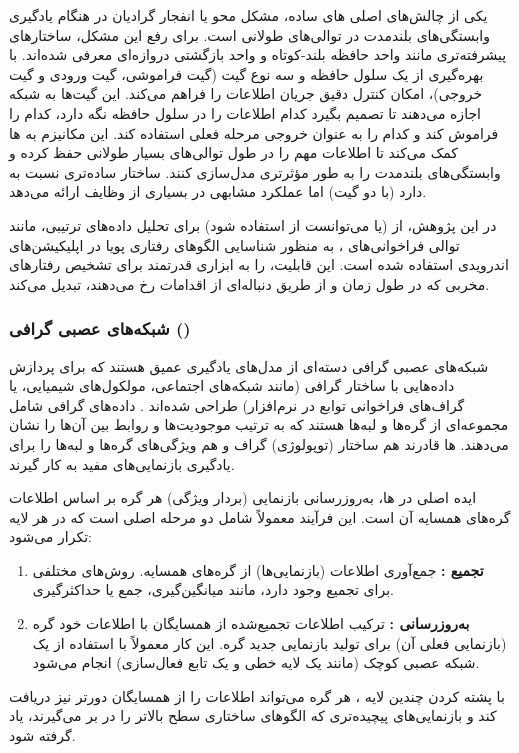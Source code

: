 یکی از چالش‌های اصلی های ساده، مشکل محو یا انفجار گرادیان  در هنگام یادگیری وابستگی‌های بلندمدت در توالی‌های طولانی است. برای رفع این مشکل، ساختارهای پیشرفته‌تری مانند واحد حافظه بلند-کوتاه  \cite{Hochreiter1997} و واحد بازگشتی دروازه‌ای  \cite{Cho2014} معرفی شده‌اند.  با بهره‌گیری از یک سلول حافظه  و سه نوع گیت (گیت فراموشی، گیت ورودی و گیت خروجی)، امکان کنترل دقیق جریان اطلاعات را فراهم می‌کند. این گیت‌ها به شبکه اجازه می‌دهند تا تصمیم بگیرد کدام اطلاعات را در سلول حافظه نگه دارد، کدام را فراموش کند و کدام را به عنوان خروجی مرحله فعلی استفاده کند. این مکانیزم به ها کمک می‌کند تا اطلاعات مهم را در طول توالی‌های بسیار طولانی حفظ کرده و وابستگی‌های بلندمدت را به طور مؤثرتری مدل‌سازی کنند.  ساختار ساده‌تری نسبت به  دارد (با دو گیت) اما عملکرد مشابهی در بسیاری از وظایف ارائه می‌دهد.

در این پژوهش، از  (یا می‌توانست از  استفاده شود) برای تحلیل داده‌های ترتیبی، مانند توالی فراخوانی‌های ، به منظور شناسایی الگوهای رفتاری پویا در اپلیکیشن‌های اندرویدی استفاده شده است. این قابلیت،  را به ابزاری قدرتمند برای تشخیص رفتارهای مخربی که در طول زمان و از طریق دنباله‌ای از اقدامات رخ می‌دهند، تبدیل می‌کند.

\subsubsection{شبکه‌های عصبی گرافی ()}
شبکه‌های عصبی گرافی  دسته‌ای از مدل‌های یادگیری عمیق هستند که برای پردازش داده‌هایی با ساختار گرافی (مانند شبکه‌های اجتماعی، مولکول‌های شیمیایی، یا گراف‌های فراخوانی توابع در نرم‌افزار) طراحی شده‌اند \cite{sanchez-lengeling2021a}. داده‌های گرافی شامل مجموعه‌ای از گره‌ها  و لبه‌ها  هستند که به ترتیب موجودیت‌ها و روابط بین آن‌ها را نشان می‌دهند. ها قادرند هم ساختار (توپولوژی) گراف و هم ویژگی‌های گره‌ها و لبه‌ها را برای یادگیری بازنمایی‌های مفید به کار گیرند.

ایده اصلی در ها، به‌روزرسانی بازنمایی (بردار ویژگی) هر گره بر اساس اطلاعات گره‌های همسایه آن است. این فرآیند معمولاً شامل دو مرحله اصلی است که در هر لایه  تکرار می‌شود:
\begin{enumerate}
    \renewcommand{\labelitemi}{\lr{$\bullet$}}
    \item \textbf{تجمیع :} جمع‌آوری اطلاعات (بازنمایی‌ها) از گره‌های همسایه. روش‌های مختلفی برای تجمیع وجود دارد، مانند میانگین‌گیری، جمع یا حداکثرگیری.
    \item \textbf{به‌روزرسانی :} ترکیب اطلاعات تجمیع‌شده از همسایگان با اطلاعات خود گره (بازنمایی فعلی آن) برای تولید بازنمایی جدید گره. این کار معمولاً با استفاده از یک شبکه عصبی کوچک (مانند یک لایه خطی و یک تابع فعال‌سازی) انجام می‌شود.
\end{enumerate}
با پشته کردن چندین لایه ، هر گره می‌تواند اطلاعات را از همسایگان دورتر نیز دریافت کند و بازنمایی‌های پیچیده‌تری که الگوهای ساختاری سطح بالاتر را در بر می‌گیرند، یاد گرفته شود.

